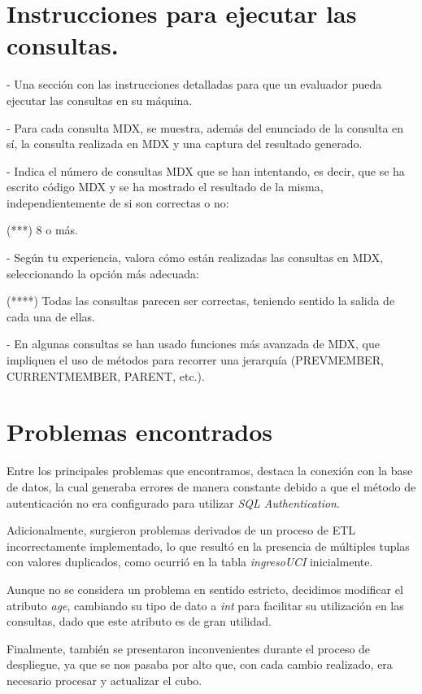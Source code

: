 \documentclass[12pt, a4paper, twoside]{article}
\begin{document}
	
	\section{Instrucciones para ejecutar las consultas.}
	- Una sección con las instrucciones detalladas para que un evaluador pueda ejecutar las consultas en su máquina. 
	
	
		- Para cada consulta MDX, se muestra, además del enunciado de la consulta en sí, la consulta realizada en MDX y una captura del resultado generado.
	
	- Indica el número de consultas MDX que se han intentando, es decir, que se ha escrito código MDX y se ha mostrado el resultado de la misma, independientemente de si son correctas o no:
	
	(***) 8 o más.
	
	
	- Según tu experiencia, valora cómo están realizadas las consultas en MDX, seleccionando la opción más adecuada:
	
	(****) Todas las consultas parecen ser correctas, teniendo sentido la salida de cada una de ellas. 
	
	
	- En algunas consultas se han usado funciones más avanzada de MDX, que impliquen el uso de métodos para recorrer una jerarquía (PREVMEMBER, CURRENTMEMBER, PARENT, etc.). 

	\section{Problemas encontrados}

	Entre los principales problemas que encontramos, destaca la conexión con la base de datos, la cual generaba errores de manera constante debido a que el método de autenticación no era configurado para utilizar \textit{SQL Authentication}.
	
	Adicionalmente, surgieron problemas derivados de un proceso de ETL incorrectamente implementado, lo que resultó en la presencia de múltiples tuplas con valores duplicados, como ocurrió en la tabla \textit{ingresoUCI} inicialmente.
	
	Aunque no se considera un problema en sentido estricto, decidimos modificar el atributo \textit{age}, cambiando su tipo de dato a \textit{int} para facilitar su utilización en las consultas, dado que este atributo es de gran utilidad.
	
	Finalmente, también se presentaron inconvenientes durante el proceso de despliegue, ya que se nos pasaba por alto que, con cada cambio realizado, era necesario procesar y actualizar el cubo.
	
\end{document}
